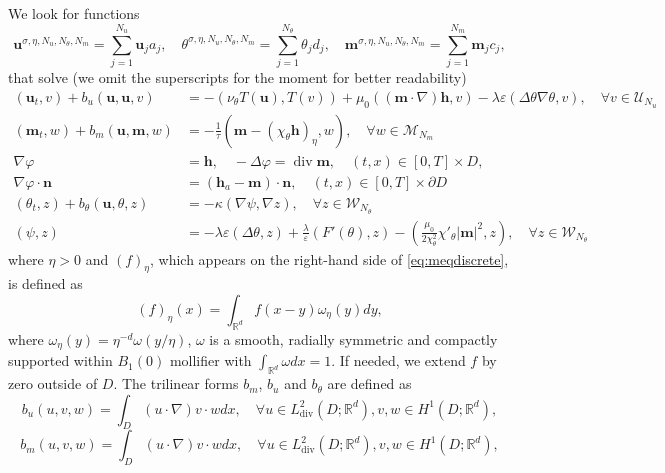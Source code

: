 \documentclass[10pt,letterpaper,twoside]{amsart}
\theoremstyle{definition}{\newtheorem{definition}[lemma]{Definition}}
\theoremstyle{note}{\newtheorem{claim}{Claim}[section]
\newtheorem*{claim*}{Claim}}
\numberwithin{equation}{section}
\newcommand{\dom}{D}
\newcommand{\eps}{\varepsilon}
\newcommand{\R}{\mathbb{R}}
\newcommand{\Grad}{\nabla}
\newcommand{\Div}{\operatorname{div}}
\newcommand{\bu}{\mathbf{u}}
\newcommand{\bm}{\mathbf{m}}
\newcommand{\bh}{\mathbf{h}}
\begin{document}
We look for functions
\begin{equation*}
	\bu^{\sigma,\eta,N_u,N_\theta,N_m} = \sum_{j=1}^{N_u} \bu_j a_j,\quad \theta^{\sigma,\eta,N_u,N_\theta,N_m}= \sum_{j=1}^{N_\theta} \theta_j d_j,\quad 
	 \bm^{\sigma,\eta,N_u,N_\theta,N_m} = \sum_{j=1}^{N_m} \bm_j c_j,
\end{equation*}
that solve (we omit the superscripts for the moment for better readability)
\begin{subequations}\label{eq:Galerkinsolve}
	\begin{align}
		(\bu_t,v)+b_u(\bu,\bu,v)&=-(\nu_\theta T(\bu),T(v))+\mu_0((\bm\cdot\Grad)\bh,v)-\lambda\eps(\Delta\theta\Grad\theta,v), \quad \forall v\in \mathcal{U}_{N_u}\label{eq:NSdiscrete}\\
		(\bm_t,w)+b_m(\bu,\bm,w)&=-\frac{1}{\tau}(\bm-(\chi_\theta\bh)_\eta,w),\quad \forall w\in \mathcal{M}_{N_m} \label{eq:meqdiscrete}\\
	 \Grad\varphi&=\bh,\quad -\Delta \varphi =\Div\bm,\quad (t,x)\in [0,T]\times \dom,\label{eq:maxwelldiscrete}\\
	  \Grad\varphi\cdot \mathbf{n}& = (\bh_a-\bm)\cdot\mathbf{n},\quad (t,x)\in [0,T]\times\partial\dom\label{eq:bcmaxwell} \\
		(\theta_t,z )+b_\theta(\bu,\theta,z)&=-\kappa(\Grad\psi,\Grad z),\quad \forall z\in\mathcal{W}_{N_\theta}\label{eq:phasefielddiscrete}\\
		(\psi,z)&= -\lambda\eps(\Delta\theta,z) +\frac{\lambda}{\eps}(F'(\theta),z)-\left(\frac{\mu_0}{2\chi_\theta^2}\chi'_\theta|\bm|^2,z\right),\quad \forall z\in \mathcal{W}_{N_\theta}\label{eq:psi1}
	\end{align}
\end{subequations}
where $\eta>0$ and $(f)_\eta$, which appears on the right-hand side of \eqref{eq:meqdiscrete}, is defined as
\begin{equation*}
	(f)_\eta(x) = \int_{\R^d} f(x-y)\omega_\eta(y) dy,
\end{equation*}
where $\omega_\eta(y) = \eta^{-d} \omega(y/\eta)$, $\omega$ is a smooth, radially symmetric and compactly supported within $B_1(0)$ mollifier with $\int_{\R^d}\omega dx =1$. If needed, we extend $f$ by zero outside of $\dom$. The trilinear forms $b_m$, $b_u$ and $b_\theta$ are defined as
\begin{equation*}
	b_u(u,v,w) = \int_{\dom} (u\cdot\Grad ) v \cdot w dx,  \quad \forall u\in L^2_{\text{div}}(\dom;\R^d), v,w\in H^1(\dom;\R^d),
\end{equation*} 
\begin{equation*}
	b_m(u,v,w) = \int_{\dom} (u\cdot\Grad ) v \cdot w dx,  \quad \forall u\in L^2_{\text{div}}(\dom;\R^d), v,w\in H^1(\dom;\R^d),
\end{equation*}
\end{document}
